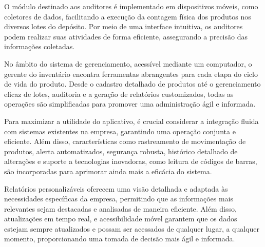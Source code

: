 O módulo destinado aos auditores é implementado em dispositivos móveis, como coletores de dados, facilitando a execução da contagem física dos produtos nos diversos lotes do depósito. Por meio de uma interface intuitiva, os auditores podem realizar suas atividades de forma eficiente, assegurando a precisão das informações coletadas.

No âmbito do sistema de gerenciamento, acessível mediante um computador, o gerente do inventário encontra ferramentas abrangentes para cada etapa do ciclo de vida do produto. Desde o cadastro detalhado de produtos até o gerenciamento eficaz de lotes, auditoria e a geração de relatórios customizados, todas as operações são simplificadas para promover uma administração ágil e informada.

Para maximizar a utilidade do aplicativo, é crucial considerar a integração fluida com sistemas existentes na empresa, garantindo uma operação conjunta e eficiente. Além disso, características como rastreamento de movimentação de produtos, alerta automatizados, segurança robusta, histórico detalhado de alterações e suporte a tecnologias inovadoras, como leitura de códigos de barras, são incorporadas para aprimorar ainda mais a eficácia do sistema.

Relatórios personalizáveis oferecem uma visão detalhada e adaptada às necessidades específicas da empresa, permitindo que as informações mais relevantes sejam destacadas e analisadas de maneira eficiente. Além disso, atualizações em tempo real, e acessibilidade móvel garantem que os dados estejam sempre atualizados e possam ser acessados de qualquer lugar, a qualquer momento, proporcionando uma tomada de decisão mais ágil e informada.


